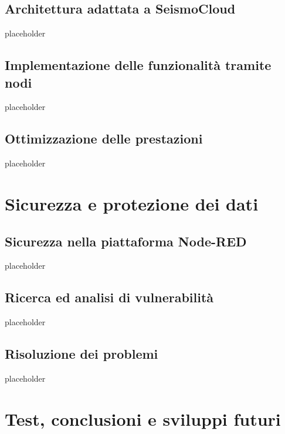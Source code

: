 \documentclass[a4paper,10pt]{memoir}
\begin{document}
\section{Architettura adattata a SeismoCloud}

placeholder

\clearpage

\section{Implementazione delle funzionalità tramite nodi}

placeholder

\clearpage

\section{Ottimizzazione delle prestazioni}

placeholder

\clearpage

\chapter{Sicurezza e protezione dei dati}

\section{Sicurezza nella piattaforma Node-RED}

placeholder

\clearpage

\section{Ricerca ed analisi di vulnerabilità}

placeholder

\clearpage

\section{Risoluzione dei problemi}

placeholder

\clearpage


\chapter{Test, conclusioni e sviluppi futuri}
\end{document}
